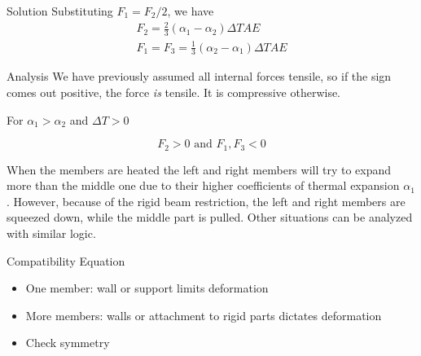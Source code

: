 \documentclass[10pt, svgnames]{beamer}
\begin{document}
\begin{frame}[label={sec:org164137c}]{Solution}
Substituting \(F_1 = F_2 / 2\), we have
\begin{gather*}
F_2 = \frac{2}{3} \left( \alpha_1 - \alpha_2 \right) \Delta T A E \\
F_1 = F_3 = \frac{1}{3} \left( \alpha_2 - \alpha_1 \right) \Delta T A E
\end{gather*}
\end{frame}

\begin{frame}[label={sec:org4a13e3a}]{Analysis}
We have previously assumed all internal forces tensile, so if the sign comes out positive, the force \emph{is} tensile. It is compressive otherwise.

For \(\alpha_1 > \alpha_2\) and \(\Delta T > 0\)

$$ F_2 > 0 \text{ and } F_1, F_3 < 0 $$

When the members are heated the left and right members will try to
expand more than the middle one due to their higher coefficients of
thermal expansion \(\alpha_1\). However, because of the rigid beam
restriction, the left and right members are squeezed down, while the
middle part is pulled. Other situations can be analyzed with similar
logic.
\end{frame}

\begin{frame}[label={sec:org0e8eada}]{Compatibility Equation}
\begin{itemize}
\item One member: wall or support limits deformation

\item More members: walls or attachment to rigid parts dictates deformation

\item Check symmetry
\end{itemize}
\end{frame}
\end{document}
